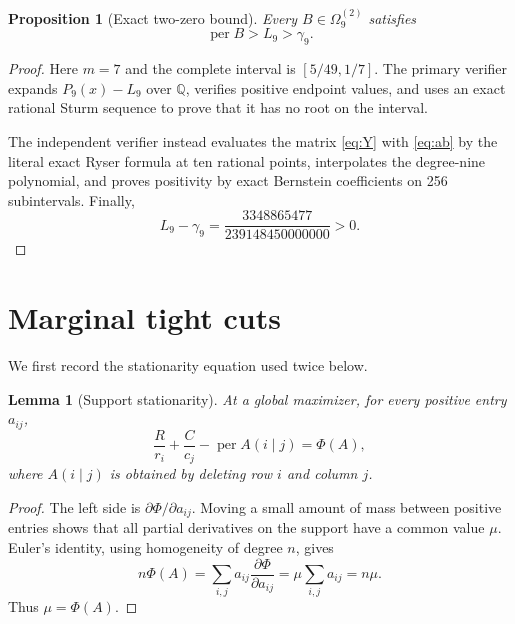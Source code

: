 \documentclass[11pt]{article}
\newtheorem{lemma}[theorem]{Lemma}
\newtheorem{proposition}[theorem]{Proposition}
\theoremstyle{remark}
\newcommand{\per}{\operatorname{per}}
\newcommand{\QQ}{\mathbb Q}
\begin{document}
\begin{proposition}[Exact two-zero bound]\label{prop:two-zero-bound}
Every $B\in\Omega_9^{(2)}$ satisfies
\[
 \per B>L_9>\gamma_9.
\]
\end{proposition}
\begin{proof}
Here $m=7$ and the complete interval is $[5/49,1/7]$.  The primary verifier
expands $P_9(x)-L_9$ over $\QQ$, verifies positive endpoint values, and uses
an exact rational Sturm sequence to prove that it has no root on the interval.

The independent verifier instead evaluates the matrix \eqref{eq:Y} with
\eqref{eq:ab} by the literal exact Ryser formula at ten rational points,
interpolates the degree-nine polynomial, and proves positivity by exact
Bernstein coefficients on 256 subintervals.  Finally,
\begin{equation}\label{eq:L-gap}
 L_9-\gamma_9=
 \frac{3348865477}{239148450000000}>0.
\end{equation}
\end{proof}

\section{Marginal tight cuts}\label{sec:marginal}

We first record the stationarity equation used twice below.

\begin{lemma}[Support stationarity]\label{lem:stationarity}
At a global maximizer, for every positive entry $a_{ij}$,
\begin{equation}\label{eq:stationarity}
 \frac{R}{r_i}+\frac{C}{c_j}-\per A(i\mid j)=\Phi(A),
\end{equation}
where $A(i\mid j)$ is obtained by deleting row $i$ and column $j$.
\end{lemma}
\begin{proof}
The left side is $\partial\Phi/\partial a_{ij}$.  Moving a small amount of
mass between positive entries shows that all partial derivatives on the
support have a common value $\mu$.  Euler's identity, using homogeneity of
degree $n$, gives
\[
 n\Phi(A)=\sum_{i,j}a_{ij}\frac{\partial\Phi}{\partial a_{ij}}
 =\mu\sum_{i,j}a_{ij}=n\mu.
\]
Thus $\mu=\Phi(A)$.
\end{proof}
\end{document}
